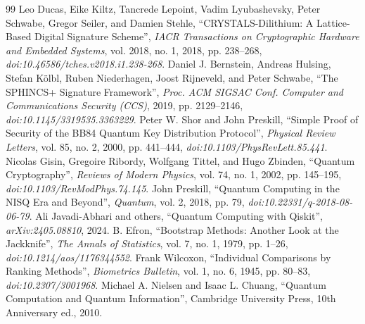 \begin{thebibliography}{99}
 Leo Ducas, Eike Kiltz, Tancrede Lepoint, Vadim Lyubashevsky, Peter Schwabe, Gregor Seiler, and Damien Stehle, \textquotedblleft{}CRYSTALS-Dilithium: A Lattice-Based Digital Signature Scheme\textquotedblright{}, \textit{IACR Transactions on Cryptographic Hardware and Embedded Systems}, vol. 2018, no. 1, 2018, pp. 238--268, \textit{doi:10.46586/tches.v2018.i1.238-268}.
 Daniel J. Bernstein, Andreas Hulsing, Stefan Kölbl, Ruben Niederhagen, Joost Rijneveld, and Peter Schwabe, \textquotedblleft{}The SPHINCS+ Signature Framework\textquotedblright{}, \textit{Proc. ACM SIGSAC Conf. Computer and Communications Security (CCS)}, 2019, pp. 2129--2146, \textit{doi:10.1145/3319535.3363229}.
 Peter W. Shor and John Preskill, \textquotedblleft{}Simple Proof of Security of the BB84 Quantum Key Distribution Protocol\textquotedblright{}, \textit{Physical Review Letters}, vol. 85, no. 2, 2000, pp. 441--444, \textit{doi:10.1103/PhysRevLett.85.441}.
 Nicolas Gisin, Gregoire Ribordy, Wolfgang Tittel, and Hugo Zbinden, \textquotedblleft{}Quantum Cryptography\textquotedblright{}, \textit{Reviews of Modern Physics}, vol. 74, no. 1, 2002, pp. 145--195, \textit{doi:10.1103/RevModPhys.74.145}.
 John Preskill, \textquotedblleft{}Quantum Computing in the NISQ Era and Beyond\textquotedblright{}, \textit{Quantum}, vol. 2, 2018, pp. 79, \textit{doi:10.22331/q-2018-08-06-79}.
 Ali Javadi-Abhari and others, \textquotedblleft{}Quantum Computing with Qiskit\textquotedblright{}, \textit{arXiv:2405.08810}, 2024.
 B. Efron, \textquotedblleft{}Bootstrap Methods: Another Look at the Jackknife\textquotedblright{}, \textit{The Annals of Statistics}, vol. 7, no. 1, 1979, pp. 1--26, \textit{doi:10.1214/aos/1176344552}.
 Frank Wilcoxon, \textquotedblleft{}Individual Comparisons by Ranking Methods\textquotedblright{}, \textit{Biometrics Bulletin}, vol. 1, no. 6, 1945, pp. 80--83, \textit{doi:10.2307/3001968}.
 Michael A. Nielsen and Isaac L. Chuang, \textquotedblleft{}Quantum Computation and Quantum Information\textquotedblright{}, Cambridge University Press, 10th Anniversary ed., 2010.
\end{thebibliography}
